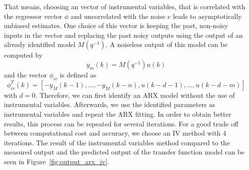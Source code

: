 That means, choosing an vector of instrumental variables, that is correlated with the regressor vector $\phi$ and uncorrelated with the noise $e$ leads to asymptotically unbiased estimates.
One choice of this vector is keeping the past, non-noisy inputs in the vector and replacing the past noisy outputs using the output of an already identified model $M(q^{-1})$. A noiseless output of this model can be computed by 
\begin{equation}
y_m(k) = M(q^{-1}) u(k)
\end{equation}
and the vector $\phi_{iv}$ is defined as
\begin{equation}
\phi_{iv}^T(k) = \left[-y_M(k-1),\ldots,-y_M(k-n),u(k-d-1),\ldots,u(k-d-m)\right]
\end{equation}
with $d=0$. 
Therefore, we can first identify an ARX model without the use of instrumental variables. Afterwards, we use the identified parameters as instrumental variables and repeat the ARX fitting.
In order to obtain better results, this process can be repeated for several iterations. For a good trade off between computational cost and accuracy, we choose an IV method with $4$ iterations. The result of the instrumental variables method compared to the measured output and the predicted output of the transfer function model can be seen in Figure~\ref{fig:output_arx_iv}. 


